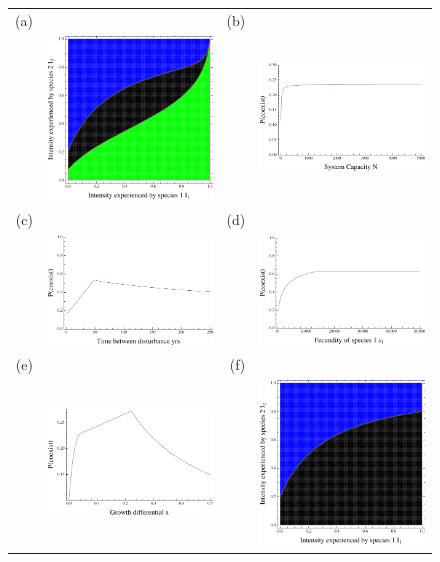 \begin{figure}[htbp]
\centering
\begin{tabular}{rrrr}
(a)&&(b)&\\
&\includegraphics[width=2in]{fullexample.pdf}&&\includegraphics[width=2in]{fullintwithN.pdf} \\
(c)&&(d)&\\
&\includegraphics[width=2in]{fullintwTd.pdf}&&\includegraphics[width=2in]{fullintwiths1.pdf} \\
(e)&&(f)&\\
&\includegraphics[width=2in]{fulltointwx.pdf}&&\includegraphics[width=2in]{fulllarges1.pdf}

\end{tabular}
\end{figure}
